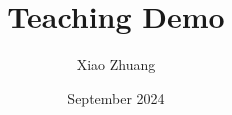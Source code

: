 \documentclass[professionalfont, 12pt, handout, t]{beamer} %
\title[]{Teaching Demo}
\author[Xiao Zhuang]{Xiao Zhuang}
\date{September 2024}
\theoremstyle{plain}
\theoremstyle{definition}
\begin{document}

\begin{frame}[plain]{}
\hsize\textwidth
\columnwidth\textwidth
\maketitle

\end{frame}

\end{document}
